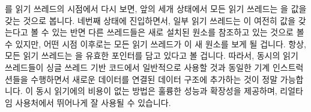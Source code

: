 \fi

를 읽기 쓰레드의 시점에서 다시 보면, 앞의 세개 상태에서 모든 읽기 쓰레드는
 을  값을 갖는 것으로 봅니다.
네번째 상태에 진입하면서, 일부 읽기 쓰레드는  이 여전히  값을
갖는다고 볼 수 있는 반면 다른 쓰레드들은 새로 설치된 원소를 참조하고 있는
것으로 볼 수 있지만, 어떤 시점 이후로는 모든 읽기 쓰레드가 이 새 원소를 보게 될
겁니다.
항상, 모든 읽기 쓰레드는  을 유효한 포인터를 담고 있다고 볼 겁니다.
따라서, 동시의 읽기 쓰레드들이 싱글 쓰레드 기반 코드에서 일반적으로 사용할 것과
동일한 기계 인스트럭션들을 수행하면서 새로운 데이터를 연결된 데이터 구조에
추가하는 것이 정말 가능합니다.
이 동시 읽기에의 비용이 없는 방법은 훌륭한 성능과 확장성을 제공하며, 리얼타임
사용처에서 뛰어나게 잘 사용될 수 있습니다.

